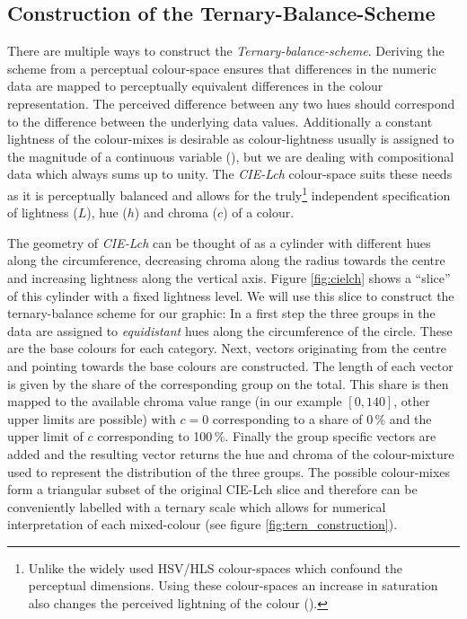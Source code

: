 \documentclass{scrartcl}
\begin{document}
\begin{appendix}

\section{Construction of the Ternary-Balance-Scheme} %
\label{sec:app-tbs}

There are multiple ways to construct the \emph{Ternary-balance-scheme}. Deriving the scheme from a perceptual colour-space ensures that differences in the numeric data are mapped to perceptually equivalent differences in the colour representation. The perceived difference between any two hues should correspond to the difference between the underlying data values. Additionally a constant lightness of the colour-mixes is desirable as colour-lightness usually is assigned to the magnitude of a continuous variable (\cite{Brewer1994}), but we are dealing with compositional data which always sums up to unity. The \emph{CIE-Lch} colour-space suits these needs as it is perceptually balanced and allows for the truly\footnote{Unlike the widely used HSV/HLS colour-spaces which confound the perceptual dimensions. Using these colour-spaces an increase in saturation also changes the perceived lightning of the colour (\cite{Brewer1999}).} independent specification of lightness ($L$), hue ($h$) and chroma ($c$) of a colour.

The geometry of \emph{CIE-Lch} can be thought of as a cylinder with different hues along the circumference, decreasing chroma along the radius towards the centre and increasing lightness along the vertical axis. Figure \ref{fig:cielch} shows a \enquote{slice} of this cylinder with a fixed lightness level. We will use this slice to construct the ternary-balance scheme for our graphic: In a first step the three groups in the data are assigned to \emph{equidistant} hues along the circumference of the circle. These are the base colours for each category. Next, vectors originating from the centre and pointing towards the base colours are constructed. The length of each vector is given by the share of the corresponding group on the total. This share is then mapped to the available chroma value range (in our example $[0,140]$, other upper limits are possible) with $c = 0$ corresponding to a share of 0\,\% and the upper limit of $c$ corresponding to 100\,\%. Finally the group specific vectors are added and the resulting vector returns the hue and chroma of the colour-mixture used to represent the distribution of the three groups. The possible colour-mixes form a triangular subset of the original CIE-Lch slice and therefore can be conveniently labelled with a ternary scale which allows for numerical interpretation of each mixed-colour (see figure \ref{fig:tern_construction}).


\end{appendix}
\end{document}

